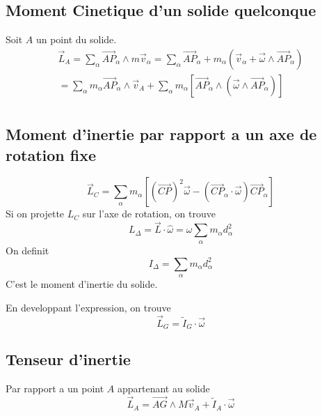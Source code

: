 \documentclass[../main.tex]{subfiles}
\begin{document}
\subsection{Moment Cinetique d'un solide quelconque}
Soit $A$ un point du solide.
\begin{align}
	\vec{L}_A = \sum_\alpha \vec{AP}_\alpha \land m \vec{v}_\alpha = \sum_\alpha \vec{AP}_\alpha + m_\alpha ( \vec{v}_\alpha + \vec{\omega} \land \vec{AP}_\alpha) \\
	= \sum_\alpha m_\alpha \vec{AP}_\alpha \land \vec{v}_A + \sum_\alpha m_\alpha \left[\vec{AP}_\alpha \land ( \vec{\omega} \land \vec{AP}_\alpha)\right] \\
\end{align}
\subsection{Moment d'inertie par rapport a un axe de rotation fixe}
\[ 
	\vec{L}_C = \sum_\alpha m_\alpha \left[ ( \vec{CP})^{2} \vec{\omega} - ( \vec{CP}_\alpha \cdot \vec{\omega}) \vec{CP}_\alpha\right] 
\]
Si on projette $L_C$ sur l'axe de rotation, on trouve
\[ 
L_\Delta = \vec{L} \cdot \hat{\omega} = \omega \sum_\alpha m_\alpha d_\alpha^{2}
\]
On definit
\[ 
I_\Delta = \sum_\alpha m_\alpha d_\alpha^{2}
\]
C'est le moment d'inertie du solide.

En developpant l'expression, on trouve
\[ 
	\vec{L}_G = \tilde{I}_G \cdot \vec{\omega}
\]
\subsection{Tenseur d'inertie}
Par rapport a un point $A$ appartenant au solide
\[ 
	\vec{L}_A = \vec{AG} \land  M \vec{v}_A + \tilde{I}_A \cdot \vec{\omega}
\]
\end{document}
